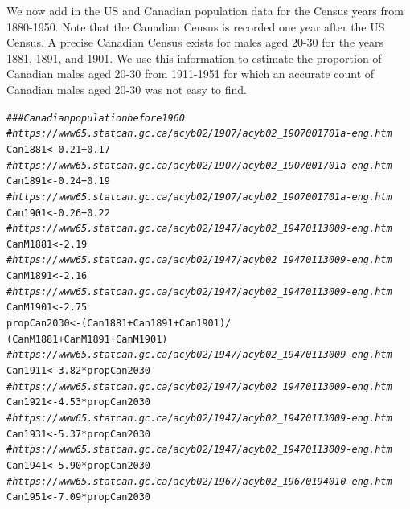 \documentclass[11pt]{article}\usepackage[]{graphicx}\usepackage[]{color}
\makeatletter
\newcommand{\hlnum}[1]{\textcolor[rgb]{0.686,0.059,0.569}{#1}}%
\newcommand{\hlcom}[1]{\textcolor[rgb]{0.678,0.584,0.686}{\textit{#1}}}%
\newcommand{\hlopt}[1]{\textcolor[rgb]{0,0,0}{#1}}%
\newcommand{\hlstd}[1]{\textcolor[rgb]{0.345,0.345,0.345}{#1}}%
\newcommand{\hlkwb}[1]{\textcolor[rgb]{0.69,0.353,0.396}{#1}}%
\newenvironment{kframe}{%
 \def\at@end@of@kframe{}%
 \ifinner\ifhmode%
  \def\at@end@of@kframe{\end{minipage}}%
  \begin{minipage}{\columnwidth}%
 \fi\fi%
 \def\FrameCommand##1{\hskip\@totalleftmargin \hskip-\fboxsep
 \colorbox{shadecolor}{##1}\hskip-\fboxsep
     \hskip-\linewidth \hskip-\@totalleftmargin \hskip\columnwidth}%
 \MakeFramed {\advance\hsize-\width
   \@totalleftmargin\z@ \linewidth\hsize
   \@setminipage}}%
 {\par\unskip\endMakeFramed%
 \at@end@of@kframe}
\newenvironment{knitrout}{}{} %
\makeatother
\begin{document}
We now add in the US and Canadian population data for the Census years from 
1880-1950.  Note that the Canadian Census is recorded one year after the 
US Census.  A precise Canadian Census exists for males aged 20-30 for the 
years 1881, 1891, and 1901.  We use this information to estimate the 
proportion of Canadian males aged 20-30 from 1911-1951 for which 
an accurate count of Canadian males aged 20-30 was not easy to find.  

\begin{knitrout}
\color{fgcolor}\begin{kframe}
\begin{alltt}
\hlcom{### Canadian population before 1960}
\hlcom{#https://www65.statcan.gc.ca/acyb02/1907/acyb02_1907001701a-eng.htm}
\hlstd{Can1881} \hlkwb{<-} \hlnum{0.21} \hlopt{+} \hlnum{0.17}
\hlcom{#https://www65.statcan.gc.ca/acyb02/1907/acyb02_1907001701a-eng.htm}
\hlstd{Can1891} \hlkwb{<-} \hlnum{0.24} \hlopt{+} \hlnum{0.19}
\hlcom{#https://www65.statcan.gc.ca/acyb02/1907/acyb02_1907001701a-eng.htm}
\hlstd{Can1901} \hlkwb{<-} \hlnum{0.26} \hlopt{+} \hlnum{0.22}
\hlcom{#https://www65.statcan.gc.ca/acyb02/1947/acyb02_19470113009-eng.htm}
\hlstd{CanM1881} \hlkwb{<-} \hlnum{2.19}
\hlcom{#https://www65.statcan.gc.ca/acyb02/1947/acyb02_19470113009-eng.htm}
\hlstd{CanM1891} \hlkwb{<-} \hlnum{2.16}
\hlcom{#https://www65.statcan.gc.ca/acyb02/1947/acyb02_19470113009-eng.htm}
\hlstd{CanM1901} \hlkwb{<-} \hlnum{2.75}
\hlstd{propCan2030} \hlkwb{<-} \hlstd{(Can1881} \hlopt{+} \hlstd{Can1891} \hlopt{+} \hlstd{Can1901)} \hlopt{/}
  \hlstd{(CanM1881} \hlopt{+} \hlstd{CanM1891} \hlopt{+} \hlstd{CanM1901)}
\hlcom{#https://www65.statcan.gc.ca/acyb02/1947/acyb02_19470113009-eng.htm}
\hlstd{Can1911} \hlkwb{<-} \hlnum{3.82} \hlopt{*} \hlstd{propCan2030}
\hlcom{#https://www65.statcan.gc.ca/acyb02/1947/acyb02_19470113009-eng.htm}
\hlstd{Can1921} \hlkwb{<-} \hlnum{4.53} \hlopt{*} \hlstd{propCan2030}
\hlcom{#https://www65.statcan.gc.ca/acyb02/1947/acyb02_19470113009-eng.htm}
\hlstd{Can1931} \hlkwb{<-} \hlnum{5.37} \hlopt{*} \hlstd{propCan2030}
\hlcom{#https://www65.statcan.gc.ca/acyb02/1947/acyb02_19470113009-eng.htm}
\hlstd{Can1941} \hlkwb{<-} \hlnum{5.90} \hlopt{*} \hlstd{propCan2030}
\hlcom{#https://www65.statcan.gc.ca/acyb02/1967/acyb02_19670194010-eng.htm}
\hlstd{Can1951} \hlkwb{<-} \hlnum{7.09} \hlopt{*} \hlstd{propCan2030}


\end{alltt}
\end{kframe}
\end{knitrout}
\end{document}
